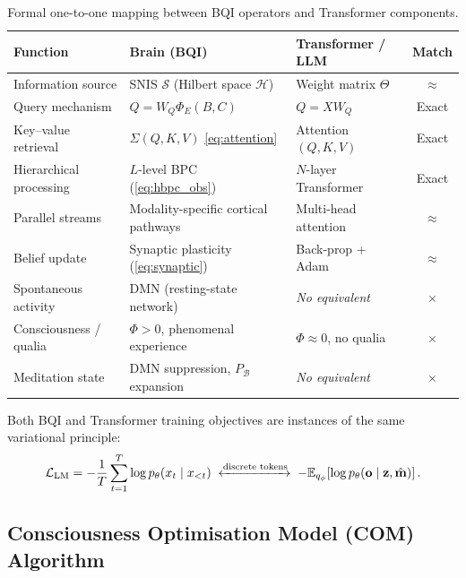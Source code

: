 \documentclass[12pt,a4paper]{article}
\theoremstyle{plain}
\theoremstyle{definition}
\theoremstyle{remark}
\newcommand{\vS}{\mathcal{S}}
\newcommand{\vH}{\mathcal{H}}
\newcommand{\vB}{\mathcal{B}}
\newcommand{\E}{\mathbb{E}}
\begin{document}

\renewcommand{\arraystretch}{1.3}
\begin{table}[htbp]
\centering
\caption{Formal one-to-one mapping between BQI operators and Transformer components.}
\begin{tabular}{p{3.0cm}p{3.8cm}p{3.8cm}c}
\toprule
\rowcolor{hdrcol}
\color{white}\textbf{Function} &
\color{white}\textbf{Brain (BQI)} &
\color{white}\textbf{Transformer / LLM} &
\color{white}\textbf{Match} \\
\midrule
Information source       & SNIS $\vS$ (Hilbert space $\vH$)     & Weight matrix $\Theta$ & $\approx$ \\
Query mechanism          & $Q = W_Q\Phi_E(B,C)$                 & $Q = XW_Q$             & Exact \\
Key--value retrieval     & $\Sigma(Q,K,V)$ \cref{eq:attention}  & Attention$(Q,K,V)$     & Exact \\
Hierarchical processing  & $L$-level BPC (\cref{eq:hbpc_obs})   & $N$-layer Transformer  & Exact \\
Parallel streams         & Modality-specific cortical pathways  & Multi-head attention   & $\approx$ \\
Belief update            & Synaptic plasticity (\cref{eq:synaptic}) & Back-prop + Adam   & $\approx$ \\
Spontaneous activity     & DMN (resting-state network)          & \textit{No equivalent} & $\times$ \\
Consciousness / qualia   & $\Phi > 0$, phenomenal experience    & $\Phi \approx 0$, no qualia & $\times$ \\
Meditation state         & DMN suppression, $P_\vB$ expansion   & \textit{No equivalent} & $\times$ \\
\bottomrule
\end{tabular}
\end{table}

\noindent Both BQI and Transformer training objectives are instances of the same variational principle:
\begin{equation}
  \mathcal{L}_{\text{LM}} = -\frac{1}{T}\sum_{t=1}^{T}\log p_\theta(x_t \mid x_{<t})
  \;\xleftrightarrow{\text{discrete tokens}}\;
  -\E_{q_\phi}\!\left[\log p_\theta(\mathbf{o} \mid \mathbf{z},\hat{\mathbf{m}})\right].
\end{equation}

\subsection{Consciousness Optimisation Model (COM) Algorithm}
\end{document}
